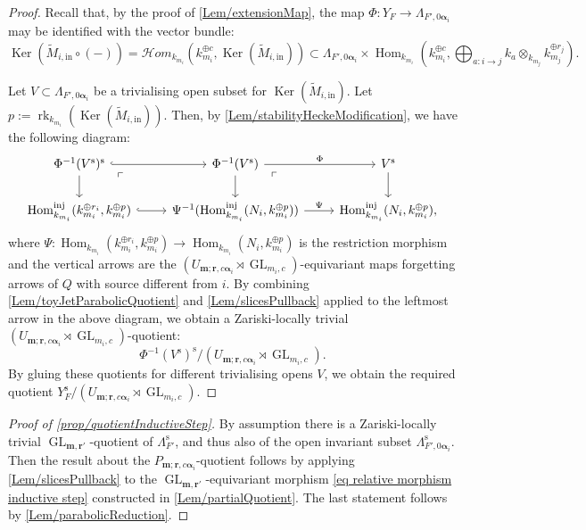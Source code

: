 \documentclass[a4paper,12pt]{article}
\theoremstyle{definition}
\theoremstyle{plain}
\theoremstyle{remark}
\DeclareMathOperator{\Ker}{Ker}
\DeclareMathOperator{\GL}{GL}
\DeclareMathOperator{\Hom}{Hom}
\DeclareMathOperator{\rk}{rk}
\newcommand{\st}{\mathrm{s}}
\newcommand\bfalpha{\bm{\alpha}}
\newcommand\bfm{\mathbf{m}}
\newcommand\bfr{\mathbf{r}}
\begin{document}
\begin{proof}
Recall that, by the proof of \cref{Lem/extensionMap}, the map $\Phi\colon Y_F\rightarrow\Lambda_{F',0\bfalpha_i}$ may be identified with the vector bundle:
\[
\Ker(\widetilde{M}_{i,\mathrm{in}}\circ (-))=\mathcal{H}om_{k_{m_i}}(k_{m_i}^{\oplus c},\Ker(\widetilde{M}_{i,\mathrm{in}}))\subset \Lambda_{F',0\bfalpha_i}\times\Hom_{k_{m_i}}\left( k_{m_i}^{\oplus c},\bigoplus_{a:i\rightarrow j}k_a\otimes_{k_{m_j}}k_{m_j}^{\oplus r_j}\right)
.
\]

Let $V\subset\Lambda_{F',0\bfalpha_i}$ be a trivialising open subset for $\Ker(\widetilde{M}_{i,\mathrm{in}})$. Let $p:=\rk_{k_{m_i}}(\Ker(\widetilde{M}_{i,\mathrm{in}}))$. Then, by \cref{Lem/stabilityHeckeModification}, we have the following diagram:
\[
\begin{tikzcd}
\Phi^{-1}(V^\st)^\st \ar[d]\ar[r,hookrightarrow]\arrow[dr, phantom, "\ulcorner", very near start] & \Phi^{-1}(V^\st) \ar[d]\ar[r,"\Phi"]\arrow[dr, phantom, "\ulcorner", very near start] & V^\st \ar[d] \\
\Hom_{k_{m_i}}^{\mathrm{inj}}(k_{m_i}^{\oplus r_i},k_{m_i}^{\oplus p}) \ar[r, hookrightarrow] & \Psi^{-1}(\Hom_{k_{m_i}}^{\mathrm{inj}}(N_i,k_{m_i}^{\oplus p})) \ar[r,"\Psi"] & \Hom_{k_{m_i}}^{\mathrm{inj}}(N_i,k_{m_i}^{\oplus p}) ,
\end{tikzcd}
\]
where $\Psi\colon \Hom_{k_{m_i}}(k_{m_i}^{\oplus r_i},k_{m_i}^{\oplus p})\rightarrow\Hom_{k_{m_i}}(N_i,k_{m_i}^{\oplus p})$ is the restriction morphism and the vertical arrows are the $(U_{\bfm;\bfr,c\bfalpha_i}\rtimes\GL_{m_i,c})$-equivariant maps forgetting arrows of $Q$ with source different from $i$. By combining \cref{Lem/toyJetParabolicQuotient} and \cref{Lem/slicesPullback} applied to the leftmost arrow in the above diagram, we obtain a Zariski-locally trivial $(U_{\bfm;\bfr,c\bfalpha_i}\rtimes\GL_{m_i,c})$-quotient: 
\[
\Phi^{-1}(V^\st)^\st/(U_{\bfm;\bfr,c\bfalpha_i}\rtimes\GL_{m_i,c}).
\]
By gluing these quotients for different trivialising opens $V$, we obtain the required quotient $Y_F^\st/(U_{\bfm;\bfr,c\bfalpha_i}\rtimes\GL_{m_i,c})$.
\end{proof}

\begin{proof}[Proof of \cref{prop/quotientInductiveStep}] 
By assumption there is a Zariski-locally trivial $\GL_{\bfm,\bfr'}$-quotient of $\Lambda_{F'}^\st$, and thus also of the open invariant subset $\Lambda_{F',0\bfalpha_i}^\st$. Then the result about the $P_{\bfm;\bfr, c\bfalpha_i}$-quotient follows by applying \cref{Lem/slicesPullback} to the $\GL_{\bfm,\bfr'}$-equivariant morphism \eqref{eq relative morphism inductive step} constructed in \cref{Lem/partialQuotient}. The last statement follows by \cref{Lem/parabolicReduction}.
\end{proof}
\end{document}
